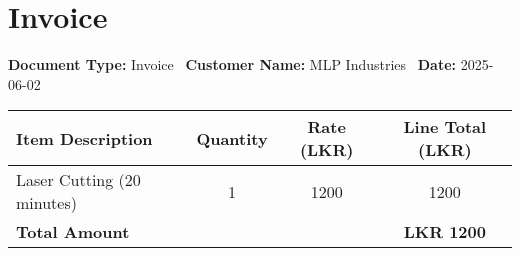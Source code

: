 \documentclass[a4paper]{article}
\begin{document}
    \section*{Invoice}
    \textbf{Document Type:} Invoice \
    \textbf{Customer Name:} MLP Industries \
    \textbf{Date:} 2025-06-02 \

    \begin{longtable}{|l|c|c|c|}
    \hline
    \textbf{Item Description} & \textbf{Quantity} & \textbf{Rate (LKR)} & \textbf{Line Total (LKR)} \\
    \hline
    Laser Cutting (20 minutes) & 1 & 1200 & 1200 \\ \hline
    \hline
    \textbf{Total Amount} & & & \textbf{LKR 1200} \\
    \hline
    \end{longtable}

    
\end{document}
